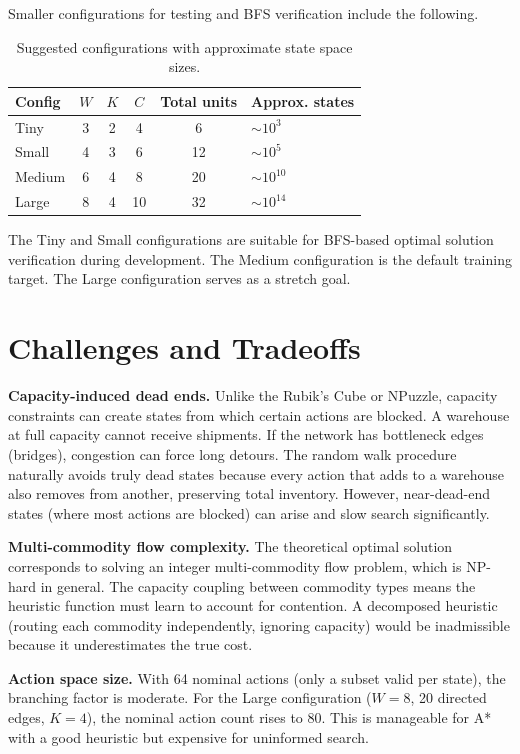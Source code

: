 \documentclass[11pt]{article}
\begin{document}
Smaller configurations for testing and BFS verification include the following.

\begin{table}[h]
\centering
\begin{tabular}{@{}lccccl@{}}
\toprule
Config & $W$ & $K$ & $C$ & Total units & Approx. states \\
\midrule
Tiny & 3 & 2 & 4 & 6 & $\sim 10^3$ \\
Small & 4 & 3 & 6 & 12 & $\sim 10^5$ \\
Medium & 6 & 4 & 8 & 20 & $\sim 10^{10}$ \\
Large & 8 & 4 & 10 & 32 & $\sim 10^{14}$ \\
\bottomrule
\end{tabular}
\caption{Suggested configurations with approximate state space sizes.}
\label{tab:configs}
\end{table}

The Tiny and Small configurations are suitable for BFS-based optimal solution verification during development. The Medium configuration is the default training target. The Large configuration serves as a stretch goal.

\section{Challenges and Tradeoffs}

\textbf{Capacity-induced dead ends.} Unlike the Rubik's Cube or NPuzzle, capacity constraints can create states from which certain actions are blocked. A warehouse at full capacity cannot receive shipments. If the network has bottleneck edges (bridges), congestion can force long detours. The random walk procedure naturally avoids truly dead states because every action that adds to a warehouse also removes from another, preserving total inventory. However, near-dead-end states (where most actions are blocked) can arise and slow search significantly.

\textbf{Multi-commodity flow complexity.} The theoretical optimal solution corresponds to solving an integer multi-commodity flow problem, which is NP-hard in general. The capacity coupling between commodity types means the heuristic function must learn to account for contention. A decomposed heuristic (routing each commodity independently, ignoring capacity) would be inadmissible because it underestimates the true cost.

\textbf{Action space size.} With 64 nominal actions (only a subset valid per state), the branching factor is moderate. For the Large configuration ($W = 8$, 20 directed edges, $K = 4$), the nominal action count rises to 80. This is manageable for A* with a good heuristic but expensive for uninformed search.
\end{document}

